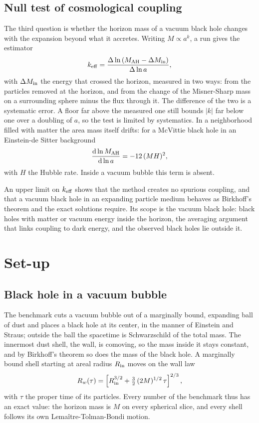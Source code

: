 \documentclass[aps,prd,twocolumn,10pt,superscriptaddress,nofootinbib,longbibliography,floatfix]{revtex4-2}
\newcommand{\dd}{\mathrm{d}}
\newcommand{\MAH}{M_{\rm AH}}
\begin{document}
\subsection{Null test of cosmological coupling}

The third question is whether the horizon mass of a vacuum black hole changes with the expansion beyond what it accretes. Writing $M\propto a^k$, a run gives the estimator
\begin{equation}
k_{\rm eff}=\frac{\Delta\ln\left(\MAH-\Delta M_{\rm in}\right)}{\Delta\ln a},
\end{equation}
with $\Delta M_{\rm in}$ the energy that crossed the horizon, measured in two ways: from the particles removed at the horizon, and from the change of the Misner-Sharp mass on a surrounding sphere minus the flux through it. The difference of the two is a systematic error. A floor far above the measured one still bounds $|k|$ far below one over a doubling of $a$, so the test is limited by systematics. In a neighborhood filled with matter the area mass itself drifts: for a McVittie black hole in an Einstein-de Sitter background \cite{Gaur:2023flrw}
\begin{equation}
\frac{\dd\ln\MAH}{\dd\ln a}=-12\,(MH)^2,
\end{equation}
with $H$ the Hubble rate. Inside a vacuum bubble this term is absent.

An upper limit on $k_{\rm eff}$ shows that the method creates no spurious coupling, and that a vacuum black hole in an expanding particle medium behaves as Birkhoff's theorem and the exact solutions require. Its scope is the vacuum black hole: black holes with matter or vacuum energy inside the horizon, the averaging argument that links coupling to dark energy, and the observed black holes lie outside it.

\section{Set-up}\label{sec:setup}

\subsection{Black hole in a vacuum bubble}

The benchmark cuts a vacuum bubble out of a marginally bound, expanding ball of dust and places a black hole at its center, in the manner of Einstein and Straus; outside the ball the spacetime is Schwarzschild of the total mass. The innermost dust shell, the wall, is comoving, so the mass inside it stays constant, and by Birkhoff's theorem so does the mass of the black hole. A marginally bound shell starting at areal radius $R_{\rm in}$ moves on the wall law
\begin{equation}
R_w(\tau)=\left[R_{\rm in}^{3/2}+\tfrac{3}{2}\,(2M)^{1/2}\,\tau\right]^{2/3},
\end{equation}
with $\tau$ the proper time of its particles. Every number of the benchmark thus has an exact value: the horizon mass is $M$ on every spherical slice, and every shell follows its own Lema\^itre-Tolman-Bondi motion.
\end{document}
